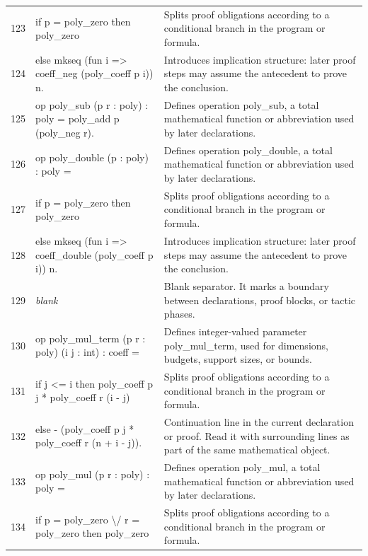 \documentclass[10pt]{article}
\begin{document}
\begin{longtable}{r L{0.53\textwidth} L{0.37\textwidth}}
123 & {\ttfamily\scriptsize   if p = poly\_zero then poly\_zero} & Splits proof obligations according to a conditional branch in the program or formula. \\
124 & {\ttfamily\scriptsize   else mkseq (fun i => coeff\_neg (poly\_coeff p i)) n.} & Introduces implication structure: later proof steps may assume the antecedent to prove the conclusion. \\
125 & {\ttfamily\scriptsize op poly\_sub (p r : poly) : poly = poly\_add p (poly\_neg r).} & Defines operation poly\_sub, a total mathematical function or abbreviation used by later declarations. \\
126 & {\ttfamily\scriptsize op poly\_double (p : poly) : poly =} & Defines operation poly\_double, a total mathematical function or abbreviation used by later declarations. \\
127 & {\ttfamily\scriptsize   if p = poly\_zero then poly\_zero} & Splits proof obligations according to a conditional branch in the program or formula. \\
128 & {\ttfamily\scriptsize   else mkseq (fun i => coeff\_double (poly\_coeff p i)) n.} & Introduces implication structure: later proof steps may assume the antecedent to prove the conclusion. \\
129 & {\ttfamily\scriptsize \emph{blank}} & Blank separator.  It marks a boundary between declarations, proof blocks, or tactic phases. \\
130 & {\ttfamily\scriptsize op poly\_mul\_term (p r : poly) (i j : int) : coeff =} & Defines integer-valued parameter poly\_mul\_term, used for dimensions, budgets, support sizes, or bounds. \\
131 & {\ttfamily\scriptsize   if j <= i then poly\_coeff p j * poly\_coeff r (i - j)} & Splits proof obligations according to a conditional branch in the program or formula. \\
132 & {\ttfamily\scriptsize   else - (poly\_coeff p j * poly\_coeff r (n + i - j)).} & Continuation line in the current declaration or proof.  Read it with surrounding lines as part of the same mathematical object. \\
133 & {\ttfamily\scriptsize op poly\_mul (p r : poly) : poly =} & Defines operation poly\_mul, a total mathematical function or abbreviation used by later declarations. \\
134 & {\ttfamily\scriptsize   if p = poly\_zero \textbackslash{}/ r = poly\_zero then poly\_zero} & Splits proof obligations according to a conditional branch in the program or formula. \\

\end{longtable}
\end{document}
